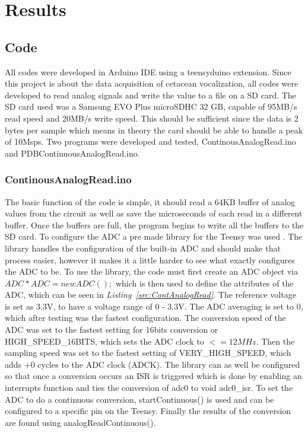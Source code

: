 \chapter{Results}



\section{Code}

All codes were developed in Arduino IDE using a teensyduino extension.
Since this project is about the data acquisition of cetacean vocalization, all codes were developed to read analog signals and write the value to a file on a SD card.
The SD card used was a Samsung EVO Plus microSDHC 32 GB, capable of 95MB/s read speed and 20MB/s write speed.
This should be sufficient since the data is 2 bytes per sample which means in theory the card should be able to handle a peak of 10Msps.
Two programs were developed and tested, ContinousAnalogRead.ino and PDBContinuousAnalogRead.ino.


\subsection{ContinousAnalogRead.ino}

The basic function of the code is simple, it should read a 64KB buffer of analog values from the circuit as well as save the microseconds of each read in a different buffer.
Once the buffers are full, the program begins to write all the buffers to the SD card.
To configure the ADC a pre made library for the Teensy was used \cite{villanueva_pedvideadc_2021}.
The library handles the configuration of the built-in ADC and should make that process easier, however it makes it a little harder to see what exactly configures the ADC to be.
To use the library, the code must first create an ADC object via 
$ADC *ADC = new ADC();$
which is then used to define the attributes of the ADC, which can be seen in %
\textit{Listing~\ref{src:ContAnalogRead}}. 
The reference voltage is set as 3.3V, to have a voltage range of 0 - 3.3V.
The ADC averaging is set to 0, which after testing was the fastest configuration.
The conversion speed of the ADC was set to the fastest setting for 16bits conversion or HIGH\_SPEED\_16BITS, which sets the ADC clock to $<= 12 MHz$.
Then the sampling speed was set to the fastest setting of VERY\_HIGH\_SPEED, which adds +0 cycles to the ADC clock (ADCK).
The library can as well be configured so that once a conversion occurs an ISR is triggered which is done by enabling an interrupts function and ties the conversion of adc0 to void adc0\_isr.
To set the ADC to do a continuous conversion, startContinuous() is used and can be configured to a specific pin on the Teensy.
Finally the results of the conversion are found using analogReadContinuous().

